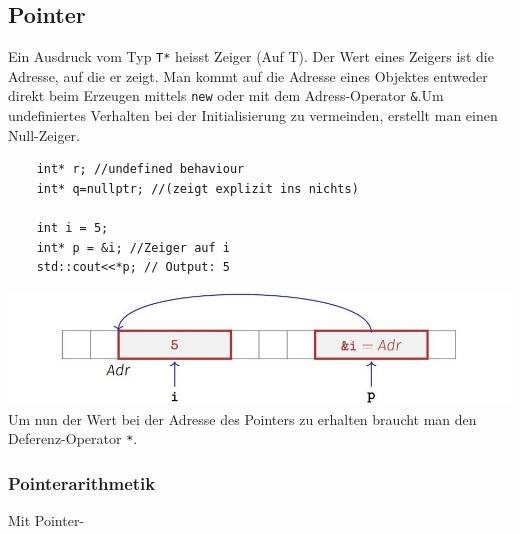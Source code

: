 \subsection{Pointer}
Ein Ausdruck vom Typ \texttt{T*} heisst Zeiger (Auf T). Der Wert eines Zeigers ist die Adresse, auf die er zeigt. Man kommt auf die Adresse eines Objektes entweder direkt beim Erzeugen mittels \texttt{new} oder mit dem Adress-Operator \texttt{\&}.Um undefiniertes Verhalten bei der Initialisierung zu vermeinden, erstellt man einen Null-Zeiger.
\begin{lstlisting}
	int* r; //undefined behaviour
	int* q=nullptr; //(zeigt explizit ins nichts)
	
	int i = 5;
	int* p = &i; //Zeiger auf i
	std::cout<<*p; // Output: 5
\end{lstlisting}
\includegraphics[width=0.24 \textwidth]{sections/pointer}
Um nun der Wert bei der Adresse des Pointers zu erhalten braucht man den Deferenz-Operator \texttt{*}.
\subsubsection{Pointerarithmetik}
Mit Pointer-




